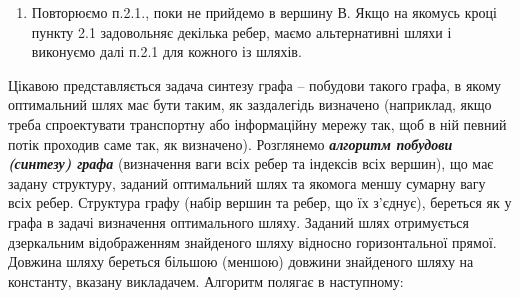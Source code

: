 \begin{enumerate}
\begin{enumerate}
\begin{enumerate}
\item Повторюємо п.2.1., поки не прийдемо в вершину $В$. Якщо на якомусь кроці пункту 2.1
  задовольняє декілька ребер, маємо альтернативні шляхи і виконуємо далі п.2.1 для кожного із
  шляхів.
\end{enumerate}
\end{enumerate}
\end{enumerate}

Цікавою представляється задача синтезу графа -- побудови такого графа, в якому оптимальний шлях має
бути таким, як заздалегідь визначено (наприклад, якщо треба спроектувати транспортну або
інформаційну мережу так, щоб в ній певний потік проходив саме так, як визначено). Розглянемо
\textbf{\emph{алгоритм побудови (синтезу) графа}} (визначення ваги всіх ребер та індексів всіх
вершин), що має задану структуру, заданий оптимальний шлях та якомога меншу сумарну вагу всіх
ребер. Структура графу (набір вершин та ребер, що їх з'єднує), береться як у графа в задачі
визначення оптимального шляху. Заданий шлях отримується дзеркальним відображенням знайденого шляху
відносно горизонтальної прямої. Довжина шляху береться більшою (меншою) довжини знайденого шляху на
константу, вказану викладачем. Алгоритм полягає в наступному:

